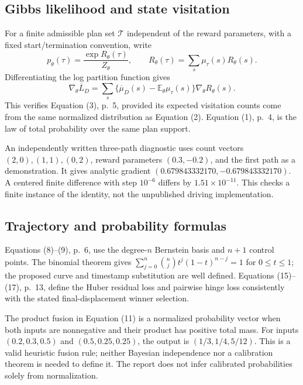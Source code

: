 \documentclass[10pt]{article}
\begin{document}
\subsection*{Gibbs likelihood and state visitation}
For a finite admissible plan set \(\mathcal T\) independent of the reward parameters, with a fixed start/termination convention, write \[p_\theta(\tau)=\frac{\exp R_\theta(\tau)}{Z_\theta},\qquad
 R_\theta(\tau)=\sum_s\mu_\tau(s)R_\theta(s).\] Differentiating the log partition function gives \[\nabla_\theta\overline L_D
 =\sum_s\{\overline\mu_D(s)-\mathbb E_\theta\mu_\tau(s)\}
       \nabla_\theta R_\theta(s).\] This verifies Equation (3), p. 5, provided its expected visitation counts come from the same normalized distribution as Equation (2). Equation (1), p. 4, is the law of total probability over the same plan support.\par
An independently written three-path diagnostic uses count vectors \((2,0),(1,1),(0,2)\), reward parameters \((0.3,-0.2)\), and the first path as a demonstration. It gives analytic gradient \((0.679843332170,-0.679843332170)\). A centered finite difference with step \(10^{-6}\) differs by \(1.51\times10^{-11}\). This checks a finite instance of the identity, not the unpublished driving implementation.\par
\subsection*{Trajectory and probability formulas}
Equations (8)–(9), p. 6, use the degree-\(n\) Bernstein basis and \(n+1\) control points. The binomial theorem gives \(\sum_{j=0}^n \binom{n}{j}t^j(1-t)^{n-j}=1\) for \(0\leq t\leq1\); the proposed curve and timestamp substitution are well defined. Equations (15)–(17), p. 13, define the Huber residual loss and pairwise hinge loss consistently with the stated final-displacement winner selection.\par
The product fusion in Equation (11) is a normalized probability vector when both inputs are nonnegative and their product has positive total mass. For inputs \((0.2,0.3,0.5)\) and \((0.5,0.25,0.25)\), the output is \((1/3,1/4,5/12)\). This is a valid heuristic fusion rule; neither Bayesian independence nor a calibration theorem is needed to define it. The report does not infer calibrated probabilities solely from normalization.\par
\end{document}
